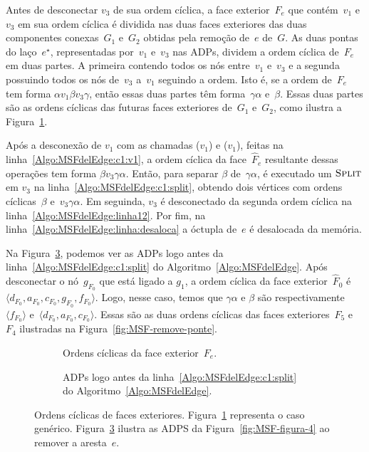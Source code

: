 Antes de desconectar $v_3$ de sua ordem cíclica, a face exterior~$F_e$ que contém~$v_1$ e~$v_3$ em sua ordem cíclica é dividida nas duas faces exteriores das duas componentes conexas~$G_1$ e~$G_2$ obtidas pela remoção de~$e$ de~$G$.
As duas pontas do laço~$e^\star$, representadas por~$v_1$ e~$v_3$ nas ADPs, dividem a ordem cíclica de~$F_e$ em duas partes.
A primeira contendo todos os nós entre~$v_1$ e~$v_3$ e a segunda possuindo todos os nós de~$v_3$ a~$v_1$ seguindo a ordem. 
Isto é, se a ordem de~$F_e$ tem forma $\alpha v_1\beta v_3\gamma$, então essas duas partes têm forma~$\gamma\alpha$ e~$\beta$.
Essas duas partes são as ordens cíclicas das futuras faces exteriores de~$G_1$ e~$G_2$, como ilustra a Figura~\ref{fig:MSF-ordem-ciclica-ponte}.

Após a desconexão de $v_1$ com as chamadas \LCOCycle($v_1$) e \LCOSplit($v_1$), feitas na linha~\ref{Algo:MSFdelEdge:c1:v1}, a ordem cíclica da face~$\hat F_e$ resultante dessas operações tem forma $\beta v_3\gamma\alpha$.
Então, para separar $\beta$ de~$\gamma\alpha$, é executado um $\text{\scshape Split}$ em $v_3$ na linha~\ref{Algo:MSFdelEdge:c1:split}, obtendo dois vértices com ordens cíclicas~$\beta$ e~$v_3\gamma\alpha$.
Em seguinda, $v_3$ é desconectado da segunda ordem cíclica na linha~\ref{Algo:MSFdelEdge:linha12}.
Por fim, na linha~\ref{Algo:MSFdelEdge:linha:desaloca} a óctupla de~$e$ é desalocada da memória.

Na Figura~\ref{fig:MSF-ordem-ciclica-ponte-e}, podemos ver as ADPs logo antes da linha~\ref{Algo:MSFdelEdge:c1:split} do Algoritmo~\ref{Algo:MSFdelEdge}.
Após desconectar o nó~$g_{F_0}$ que está ligado a $g_1$, a ordem cíclica da face exterior~$\hat F_0$ é $\langle d_{F_0}, a_{F_0}, c_{F_0}, g_{F_0}, f_{F_0}\rangle$.
Logo, nesse caso, temos que $\gamma\alpha$ e $\beta$ são respectivamente $\langle f_{F_0} \rangle$ e~$\langle d_{F_0}, a_{F_0}, c_{F_0}\rangle$.
Essas são as duas ordens cíclicas das faces exteriores~$F_5$ e $F_4$ ilustradas na Figura~\ref{fig:MSF-remove-ponte}.

\begin{figure}[htb]
\begin{subfigure}{.4\textwidth}

\caption{Ordens cíclicas da face exterior~$F_e$.}
\label{fig:MSF-ordem-ciclica-ponte}
\end{subfigure}
\hfill
\begin{subfigure}{.4\textwidth}

\caption{ADPs logo antes da linha~\ref{Algo:MSFdelEdge:c1:split} do Algoritmo~\ref{Algo:MSFdelEdge}.}
\label{fig:MSF-ordem-ciclica-ponte-e}
\end{subfigure}
	\caption{Ordens cíclicas de faces exteriores. Figura~\ref{fig:MSF-ordem-ciclica-ponte} representa o caso genérico. Figura~\ref{fig:MSF-ordem-ciclica-ponte-e} ilustra as ADPS da Figura~\ref{fig:MSF-figura-4} ao remover a aresta~$e$.}
\end{figure}




